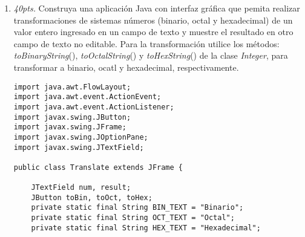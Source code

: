 \documentclass[10pt]{article}
\begin{document}
{\begin{enumerate}
\begin{verbatim}
public class ThreadCuentaCorrienteGirar extends Thread {

    private final CuentaCorriente cuentaCorriente;

    public ThreadCuentaCorrienteGirar(CuentaCorriente cuentaCorriente1) {
        this.cuentaCorriente = cuentaCorriente1;
    }

    @Override
    public void run() {
        while (true) {
            try {
                ThreadCuentaCorrienteGirar.sleep((long) (1 + (int) (Math.random() * 5)) * 1000);
                cuentaCorriente.girar((int) (10000 * Math.random()));
            } catch (InterruptedException ex) {
            }
        }
    }
}

public class Principal {

    public static void main(String[] args) {

        CuentaCorriente cc = new CuentaCorriente();

        ThreadCuentaCorrienteDepositar tccd = new ThreadCuentaCorrienteDepositar(cc);
        ThreadCuentaCorrienteGirar tccg = new ThreadCuentaCorrienteGirar(cc);

        tccd.start();
        tccg.start();

        try {
            tccd.join();
            tccg.join();
        } catch (InterruptedException ex) {
        }
    }
}
\end{verbatim}

		\newpage

		\item \emph{40pts.} Construya una aplicaci\'on Java con interfaz gr\'afica que pemita realizar transformaciones de sistemas n\'umeros (binario, octal y hexadecimal) de un valor entero ingresado en un campo de texto y muestre el resultado en otro campo de texto no editable. Para la transformaci\'on utilice los m\'etodos: \emph{toBinaryString}(), \emph{toOctalString}() y \emph{toHexString}() de la clase \emph{Integer}, para transformar a binario, ocatl y hexadecimal, respectivamente.

\begin{verbatim}
import java.awt.FlowLayout;
import java.awt.event.ActionEvent;
import java.awt.event.ActionListener;
import javax.swing.JButton;
import javax.swing.JFrame;
import javax.swing.JOptionPane;
import javax.swing.JTextField;

public class Translate extends JFrame {

    JTextField num, result;
    JButton toBin, toOct, toHex;
    private static final String BIN_TEXT = "Binario";
    private static final String OCT_TEXT = "Octal";
    private static final String HEX_TEXT = "Hexadecimal";


\end{verbatim}
\end{enumerate}}
\end{document}
